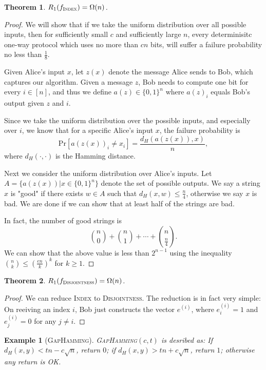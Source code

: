 \documentclass[openany]{book}
\newtheorem{theorem}{Theorem}[chapter]
\newtheorem{example}{Example}[chapter]
\begin{document}
\begin{theorem}\label{randOneWayInd}
    $R_1(f_{\textsc{Index}})=\Omega(n)$.
\end{theorem}
\begin{proof}
    We will show that if we take the uniform distribution over all possible inputs, then for sufficiently small $c$ and sufficiently large $n$, every determinisitc one-way protocol which uses no more than $cn$ bits, will suffer a failure probability no less than $\frac{1}{8}$.

    Given Alice's input $x$, let $z(x)$ denote the message Alice sends to Bob, which captures our algorithm. Given a message $z$, Bob needs to compute one bit for every $i\in[n]$, and thus we define $a(z)\in\{0,1\}^n$ where $a(z)_i$ equals Bob's output given $z$ and $i$.

    Since we take the uniform distribution over the possible inputs, and especially over $i$, we know that for a specific Alice's input $x$, the failure probability is
    \begin{equation}
        \mathrm{Pr}[a(z(x))_i\ne x_i]=\frac{d_H(a(z(x)),x)}{n},
    \end{equation}
    where $d_H(\cdot,\cdot)$ is the Hamming distance.

    Next we consider the uniform distribution over Alice's inputs. Let $A=\{a(z(x))|x\in\{0,1\}^n\}$ denote the set of possible outputs. We say a string $x$ is "good" if there exists $w\in A$ such that $d_H(x,w)\le \frac{n}{4}$, otherwise we say $x$ is bad. We are done if we can show that at least half of the strings are bad.

    In fact, the number of good strings is
    \begin{equation}
        \binom{n}{0}+\binom{n}{1}+\cdots+\binom{n}{\frac{n}{4}}.
    \end{equation}
    We can show that the above value is less than $2^{n-1}$ using the inequality $\binom{n}{k}\le(\frac{en}{k})^k$ for $k\ge1$.
\end{proof}
\begin{theorem}\label{randOneWayDisj}
    $R_1(f_{\textsc{Disjointness}})=\Omega(n)$.
\end{theorem}
\begin{proof}
    We can reduce \textsc{Index} to \textsc{Disjointness}. The reduction is in fact very simple: On reeiving an index $i$, Bob just constructs the vector $e^{(i)}$, where $e^{(i)}_i=1$ and $e^{(i)}_j=0$ for any $j\ne i$.
\end{proof}
\begin{example}[\textsc{GapHamming}]
    \textsc{GapHamming}$(c,t)$ is desribed as: If $d_H(x,y)<tn-c\sqrt{n}$, return $0$; if $d_H(x,y)>tn+c\sqrt{n}$, return $1$; otherwise any return is OK.
\end{example}
\end{document}
